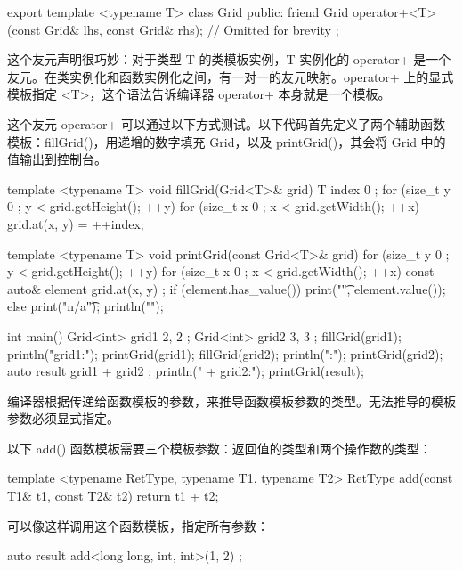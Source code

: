 \begin{cpp}
export template <typename T>
class Grid
{
    public:
        friend Grid operator+<T>(const Grid& lhs, const Grid& rhs);
        // Omitted for brevity
};
\end{cpp}

这个友元声明很巧妙：对于类型 T 的类模板实例，T 实例化的 operator+ 是一个友元。在类实例化和函数实例化之间，有一对一的友元映射。operator+ 上的显式模板指定 <T>，这个语法告诉编译器 operator+ 本身就是一个模板。

这个友元 operator+ 可以通过以下方式测试。以下代码首先定义了两个辅助函数模板：fillGrid()，用递增的数字填充 Grid，以及 printGrid()，其会将 Grid 中的值输出到控制台。

\begin{cpp}
template <typename T> void fillGrid(Grid<T>& grid)
{
    T index { 0 };
    for (size_t y { 0 }; y < grid.getHeight(); ++y) {
        for (size_t x { 0 }; x < grid.getWidth(); ++x) {
            grid.at(x, y) = ++index;
        }
    }
}

template <typename T> void printGrid(const Grid<T>& grid)
{
    for (size_t y { 0 }; y < grid.getHeight(); ++y) {
        for (size_t x { 0 }; x < grid.getWidth(); ++x) {
            const auto& element { grid.at(x, y) };
            if (element.has_value()) { print("{}\t", element.value()); }
            else { print("n/a\t"); }
        }
        println("");
    }
}

int main()
{
    Grid<int> grid1 { 2, 2 };
    Grid<int> grid2 { 3, 3 };
    fillGrid(grid1); println("grid1:"); printGrid(grid1);
    fillGrid(grid2); println(":"); printGrid(grid2);
    auto result { grid1 + grid2 };
    println(" + grid2:"); printGrid(result);
}
\end{cpp}


编译器根据传递给函数模板的参数，来推导函数模板参数的类型。无法推导的模板参数必须显式指定。

以下 add() 函数模板需要三个模板参数：返回值的类型和两个操作数的类型：

\begin{cpp}
template <typename RetType, typename T1, typename T2>
RetType add(const T1& t1, const T2& t2) { return t1 + t2; }
\end{cpp}

可以像这样调用这个函数模板，指定所有参数：

\begin{cpp}
auto result { add<long long, int, int>(1, 2) };
\end{cpp}

